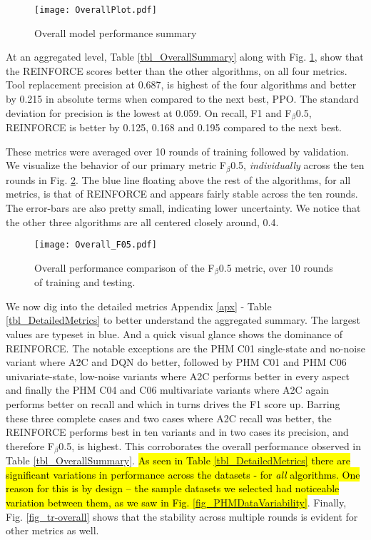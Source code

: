 \documentclass[referee, sn-mathphys-num]{sn-jnl}
\newcommand{\hlc}[2][cyan!15]{{\colorlet{foo}{#1}\sethlcolor{foo}\hl{#2}}}
\begin{document}
	\begin{figure}[hbt!]
		\centering
		\texttt{[image: OverallPlot.pdf]}  
		\caption{Overall model performance summary}
		\label{fig_OverallSummary}
	\end{figure}
	At an aggregated level, Table {\ref{tbl_OverallSummary}} along with Fig. {\ref{fig_OverallSummary}}, show that the REINFORCE scores better than the other algorithms, on all four metrics. Tool replacement precision at 0.687, is highest of the four algorithms and better by 0.215 in absolute terms when compared to the next best, PPO. The standard deviation for precision is the lowest at 0.059. On recall, F1 and F$_\beta$0.5, REINFORCE is better by 0.125, 0.168 and 0.195 compared to the next best.
	
	These metrics were averaged over 10 rounds of training followed by validation. We visualize the behavior of our primary metric F$_\beta$0.5, \textit{individually} across the ten rounds in Fig. {\ref{fig_FbetaOverall}}. The blue line floating above the rest of the algorithms, for all metrics, is that of REINFORCE and appears fairly stable across the ten rounds. The error-bars are also pretty small, indicating lower uncertainty. We notice that the other three algorithms are all centered closely around, 0.4.
	\begin{figure}[hbt!]
		\centering
		\texttt{[image: Overall\_F05.pdf]}  
		\caption{Overall performance comparison of the F$_\beta$0.5 metric, over 10 rounds of training and testing.}
		\label{fig_FbetaOverall}
	\end{figure}
	
	We now dig into the detailed metrics Appendix {\ref{apx}} - Table {\ref{tbl_DetailedMetrics}} to better understand the aggregated summary. The largest values are typeset in {\textcolor{dblue}{blue}}. And a quick visual glance shows the dominance of REINFORCE. The notable exceptions are the PHM C01 single-state and no-noise variant where A2C and DQN do better, followed by PHM C01 and PHM C06 univariate-state, low-noise variants where A2C performs better in every aspect and finally the PHM C04 and C06 multivariate variants where A2C again performs better on recall and which in turns drives the F1 score up. Barring these three complete cases and two cases where A2C recall was better, the REINFORCE performs best in ten variants and in two cases its precision, and therefore F$_\beta$0.5, is highest. This corroborates the overall performance observed in Table {\ref{tbl_OverallSummary}}. \hlc{As seen in Table {\ref{tbl_DetailedMetrics}} there are significant variations in performance across the datasets - for \textit{all} algorithms. One reason for this is by design -- the sample datasets we selected had noticeable variation between them, as we saw in Fig. {\ref{fig_PHMDataVariability}}}. Finally, Fig. {\ref{fig_tr-overall}} shows that the stability across multiple rounds is evident for other metrics as well.
	
\end{document}
